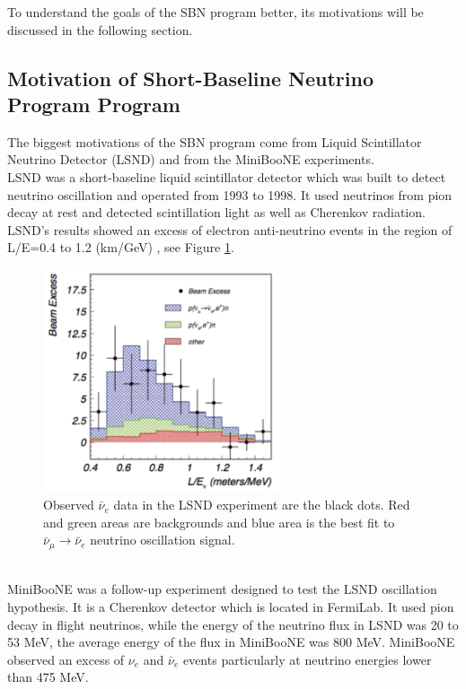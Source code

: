 \documentclass[a4paper]{article}\linespread{1.4}
\begin{document}
To understand the goals of the SBN program better, its motivations will be discussed in the following section.

\subsection{Motivation of Short-Baseline Neutrino Program Program}

The biggest motivations of the SBN program come from Liquid Scintillator Neutrino Detector (LSND) and from the MiniBooNE experiments.
\\LSND was a short-baseline liquid scintillator detector which was built to detect neutrino oscillation and operated from 1993 to 1998. It used neutrinos from pion decay at rest and detected scintillation light as well as Cherenkov radiation. LSND's results showed an excess of electron anti-neutrino events in the region of L/E=0.4 to 1.2 (km/GeV) \cite{K}, %
see Figure \ref{fig:lsnd}.
\begin{figure}[h!] \centering \includegraphics[width=70mm,scale=1.0]{lsnd.png} \caption{Observed $\bar{\nu}_{e}$ data in the LSND experiment are the black dots. Red and green areas are backgrounds and blue area is the best fit to $\bar{\nu}_{\mu} \to  \bar{\nu}_{e}$ neutrino oscillation signal. \cite{MN}} \label{fig:lsnd} \end{figure}  
\\MiniBooNE was a follow-up experiment designed to test the LSND oscillation hypothesis.
It is a Cherenkov detector which is located in FermiLab. It used pion decay in flight neutrinos,
while the energy of the neutrino flux in LSND was 20 to 53 MeV, the average energy of the flux in MiniBooNE was 800 MeV.
MiniBooNE observed an excess of $\nu_{e}$ and  $\bar{\nu}_{e}$ events particularly at neutrino energies lower than 475 MeV.
\end{document}
